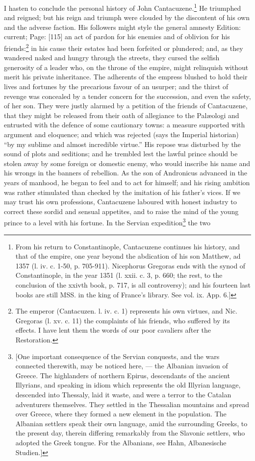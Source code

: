 I hasten to conclude the personal history of John Cantacuzene.\footnote{From his return to Constantinople, Cantacuzene continues his history, and that of the empire, one year beyond the abdication of his son Matthew, ad 1357 (l. iv. c. 1-50, p. 705-911). Nicephorus Gregoras ends with the synod of Constantinople, in the year 1351 (l. xxii. c. 3, p. 660; the rest, to the conclusion of the xxivth book, p. 717, is all controversy); and his fourteen last books are still MSS. in the king of France\texthebrew{}’s library. See vol. ix. App. 6.]} He triumphed and reigned; but his reign and triumph were clouded by the discontent of his own and the adverse faction. His followers might style the general amnesty Edition: current; Page: [115] an act of pardon for his enemies and of oblivion for his friends:\footnote{The emperor (Cantacuzen. l. iv. c. 1) represents his own virtues, and Nic. Gregoras (l. xv. c. 11) the complaints of his friends, who suffered by its effects. I have lent them the words of our poor cavaliers after the Restoration.} in his cause their estates had been forfeited or plundered; and, as they wandered naked and hungry through the streets, they cursed the selfish generosity of a leader who, on the throne of the empire, might relinquish without merit his private inheritance. The adherents of the empress blushed to hold their lives and fortunes by the precarious favour of an usurper; and the thirst of revenge was concealed by a tender concern for the succession, and even the safety, of her son. They were justly alarmed by a petition of the friends of Cantacuzene, that they might be released from their oath of allegiance to the Palæologi and entrusted with the defence of some cautionary towns: a measure supported with argument and eloquence; and which was rejected (says the Imperial historian) \texthebrew{“}by my sublime and almost incredible virtue.\texthebrew{}” His repose was disturbed by the sound of plots and seditions; and he trembled lest the lawful prince should be stolen away by some foreign or domestic enemy, who would inscribe his name and his wrongs in the banners of rebellion. As the son of Andronicus advanced in the years of manhood, he began to feel and to act for himself; and his rising ambition was rather stimulated than checked by the imitation of his father\texthebrew{}’s vices. If we may trust his own professions, Cantacuzene laboured with honest industry to correct these sordid and sensual appetites, and to raise the mind of the young prince to a level with his fortune. In the Servian expedition\footnote{[One important consequence of the Servian conquests, and the wars connected therewith, may be noticed here, \texthebrew{—} the Albanian invasion of Greece. The highlanders of northern Epirus, descendants of the ancient Illyrians, and speaking in idiom which represents the old Illyrian language, descended into Thessaly, laid it waste, and were a terror to the Catalan adventurers themselves. They settled in the Thessalian mountains and spread over Greece, where they formed a new element in the population. The Albanian settlers speak their own language, amid the surrounding Greeks, to the present day, therein differing remarkably from the Slavonic settlers, who adopted the Greek tongue. For the Albanians, see Hahn, Albanesische Studien.]} the two 